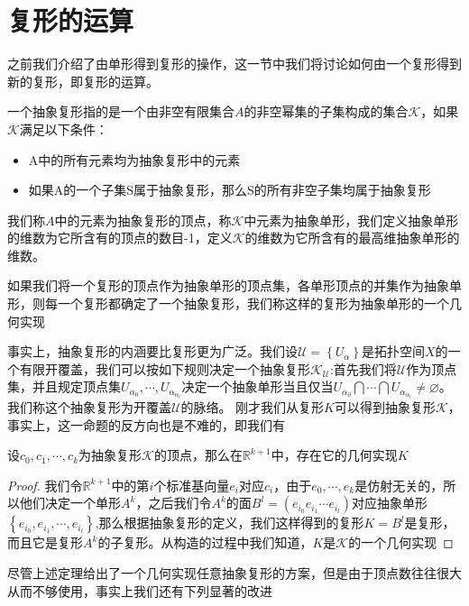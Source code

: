 \section{复形的运算}
之前我们介绍了由单形得到复形的操作，这一节中我们将讨论如何由一个复形得到新的复形，即复形的运算。
\begin{definition}
一个抽象复形指的是一个由非空有限集合$A$的非空幂集的子集构成的集合$\mathcal{K}$，如果$\mathcal{K}$满足以下条件：
\begin{itemize}
    \item A中的所有元素均为抽象复形中的元素
    \item 如果A的一个子集S属于抽象复形，那么S的所有非空子集均属于抽象复形
\end{itemize}
我们称$A$中的元素为抽象复形的顶点，称$\mathcal{K}$中元素为抽象单形，我们定义抽象单形的维数为它所含有的顶点的数目-1，定义$\mathcal{K}$的维数为它所含有的最高维抽象单形的维数。
\end{definition}
\begin{definition}
如果我们将一个复形的顶点作为抽象单形的顶点集，各单形顶点的并集作为抽象单形，则每一个复形都确定了一个抽象复形，我们称这样的复形为抽象单形的一个几何实现
\end{definition}
事实上，抽象复形的内涵要比复形更为广泛。我们设$\mathcal{U}=\left\{U_{\alpha}\right\}$是拓扑空间$X$的一个有限开覆盖，我们可以按如下规则决定一个抽象复形$\mathcal{K}_{\mathcal{U}}$:首先我们将$\mathcal{U}$作为顶点集，并且规定顶点集$U_{\alpha_{0}},\cdots,U_{\alpha_{\alpha_{l}}}$决定一个抽象单形当且仅当$U_{\alpha_{0}}\bigcap\cdots\bigcap U_{\alpha_{\alpha_{l}}}\neq \varnothing$。我们称这个抽象复形为开覆盖$\mathcal{U}$的脉络。
刚才我们从复形$K$可以得到抽象复形$\mathcal{K}$，事实上，这一命题的反方向也是不难的，即我们有
\begin{proposition}
设$c_{0},c_{1},\cdots,c_{k}$为抽象复形$\mathcal{K}$的顶点，那么在$\mathbb{R}^{k+1}$中，存在它的几何实现$K$
\end{proposition}
\begin{proof}
我们令$\mathbb{R}^{k+1}$中的第$i$个标准基向量$e_{i}$对应$c_{i}$，由于$e_{0},\cdots,e_{k}$是仿射无关的，所以他们决定一个单形$A^{k}$，之后我们令$A^{k}$的面$B^{l}=(e_{i_{0}}e_{i_{1}}\cdots e_{i_{l}})$对应抽象单形$\left\{e_{i_{0}},e_{i_{1}},\cdots, e_{i_{l}}\right\}$,那么根据抽象复形的定义，我们这样得到的复形$K={B^{l}}$是复形，而且它是复形$A^{k}$的子复形。从构造的过程中我们知道，$K$是$\mathcal{K}$的一个几何实现
\end{proof}
尽管上述定理给出了一个几何实现任意抽象复形的方案，但是由于顶点数往往很大从而不够使用，事实上我们还有下列显著的改进
